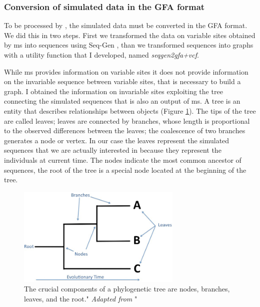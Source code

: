 \subsubsection{Conversion of simulated data in the GFA format}  

To be processed by \vgp, the simulated data must be converted in the GFA format. We did this in two steps. First we transformed the data on variable sites obtained by ms into sequences using Seq-Gen \cite{rambaut1997seq}, than we transformed sequences into graphs with a utility function that I developed, named \textit{seqgen2gfa+vcf}. 





While ms provides information on variable sites it does not provide information on the invariable sequence between variable sites, that is necessary to build a graph. I obtained the information on invariable sites exploiting the tree connecting the simulated sequences that is also an output of ms. A tree is an entity that describes relationships between objects (Figure \ref{fig:phylogenies.jpg}). The tips of the tree are called leaves; leaves are connected by branches, whose length is proportional to the observed differences between the leaves; the coalescence of two branches generates a node or vertex. In our case the leaves represent the simulated sequences that we are actually interested in because they represent the individuals at current time. The nodes indicate the most common ancestor of sequences, the root of the tree is a special node located at the beginning of the tree. 




\begin{figure}[H]
\centering
\includegraphics[width=0.70\textwidth]{fig/phylogenies.jpg}
\decoRule
\caption{The crucial components of a phylogenetic tree are nodes, branches, leaves, and the root." \textit{Adapted from} \cite{phylogenetictree}"} 
\label{fig:phylogenies.jpg}
\end{figure}

